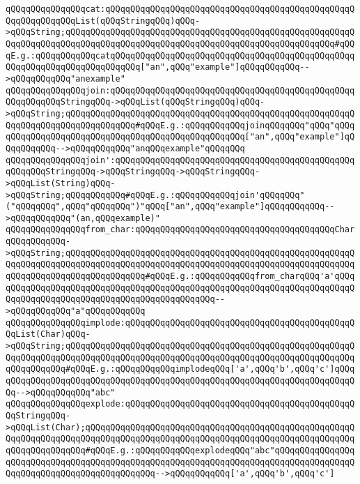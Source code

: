\verb|qQQqqQQqqQQqqQQqcat:qQQqqQQqqQQqqQQqqQQqqQQqqQQqqQQqqQQqqQQqqQQqqQQqqQQqqQQqqQQqqQQqList(qQQqStringqQQq)qQQq->qQQqString;qQQqqQQqqQQqqQQqqQQqqQQqqQQqqQQqqQQqqQQqqQQqqQQqqQQqqQQqqQQqqQQqqQQqqQQqqQQqqQQqqQQqqQQqqQQqqQQqqQQqqQQqqQQqqQQqqQQqqQQqqQQq#qQQqE.g.:qQQqqQQqqQQqcatqQQqqQQqqQQqqQQqqQQqqQQqqQQqqQQqqQQqqQQqqQQqqQQqqQQqqQQqqQQqqQQqqQQqqQQqqQQq["an",qQQq"example"]qQQqqQQqqQQq-->qQQqqQQqqQQq"anexample"|\newline
\verb|qQQqqQQqqQQqqQQqjoin:qQQqqQQqqQQqqQQqqQQqqQQqqQQqqQQqqQQqqQQqqQQqqQQqqQQqqQQqqQQqStringqQQq->qQQqList(qQQqStringqQQq)qQQq->qQQqString;qQQqqQQqqQQqqQQqqQQqqQQqqQQqqQQqqQQqqQQqqQQqqQQqqQQqqQQqqQQqqQQqqQQqqQQqqQQqqQQqqQQq#qQQqE.g.:qQQqqQQqqQQqjoinqQQqqQQq"qQQq"qQQqqQQqqQQqqQQqqQQqqQQqqQQqqQQqqQQqqQQqqQQqqQQqqQQq["an",qQQq"example"]qQQqqQQqqQQq-->qQQqqQQqqQQq"anqQQqexample"qQQqqQQq|\newline
\verb|qQQqqQQqqQQqqQQqjoin':qQQqqQQqqQQqqQQqqQQqqQQqqQQqqQQqqQQqqQQqqQQqqQQqqQQqqQQqStringqQQq->qQQqStringqQQq->qQQqStringqQQq->qQQqList(String)qQQq->qQQqString;qQQqqQQqqQQq#qQQqE.g.:qQQqqQQqqQQqjoin'qQQqqQQq"("qQQqqQQq",qQQq"qQQqqQQq")"qQQq["an",qQQq"example"]qQQqqQQqqQQq-->qQQqqQQqqQQq"(an,qQQqexample)"|\newline
\verb|qQQqqQQqqQQqqQQqfrom_char:qQQqqQQqqQQqqQQqqQQqqQQqqQQqqQQqqQQqqQQqCharqQQqqQQqqQQq->qQQqString;qQQqqQQqqQQqqQQqqQQqqQQqqQQqqQQqqQQqqQQqqQQqqQQqqQQqqQQqqQQqqQQqqQQqqQQqqQQqqQQqqQQqqQQqqQQqqQQqqQQqqQQqqQQqqQQqqQQqqQQqqQQqqQQqqQQqqQQqqQQqqQQqqQQqqQQqqQQq#qQQqE.g.:qQQqqQQqqQQqfrom_charqQQq'a'qQQqqQQqqQQqqQQqqQQqqQQqqQQqqQQqqQQqqQQqqQQqqQQqqQQqqQQqqQQqqQQqqQQqqQQqqQQqqQQqqQQqqQQqqQQqqQQqqQQqqQQqqQQqqQQqqQQq-->qQQqqQQqqQQq"a"qQQqqQQqqQQq|\newline
\verb|qQQqqQQqqQQqqQQqimplode:qQQqqQQqqQQqqQQqqQQqqQQqqQQqqQQqqQQqqQQqqQQqqQQqList(Char)qQQq->qQQqString;qQQqqQQqqQQqqQQqqQQqqQQqqQQqqQQqqQQqqQQqqQQqqQQqqQQqqQQqqQQqqQQqqQQqqQQqqQQqqQQqqQQqqQQqqQQqqQQqqQQqqQQqqQQqqQQqqQQqqQQqqQQqqQQqqQQqqQQqqQQq#qQQqE.g.:qQQqqQQqqQQqimplodeqQQq['a',qQQq'b',qQQq'c']qQQqqQQqqQQqqQQqqQQqqQQqqQQqqQQqqQQqqQQqqQQqqQQqqQQqqQQqqQQqqQQqqQQqqQQqqQQq-->qQQqqQQqqQQq"abc"|\newline
\verb|qQQqqQQqqQQqqQQqexplode:qQQqqQQqqQQqqQQqqQQqqQQqqQQqqQQqqQQqqQQqqQQqqQQqStringqQQq->qQQqList(Char);qQQqqQQqqQQqqQQqqQQqqQQqqQQqqQQqqQQqqQQqqQQqqQQqqQQqqQQqqQQqqQQqqQQqqQQqqQQqqQQqqQQqqQQqqQQqqQQqqQQqqQQqqQQqqQQqqQQqqQQqqQQqqQQqqQQqqQQqqQQq#qQQqE.g.:qQQqqQQqqQQqexplodeqQQq"abc"qQQqqQQqqQQqqQQqqQQqqQQqqQQqqQQqqQQqqQQqqQQqqQQqqQQqqQQqqQQqqQQqqQQqqQQqqQQqqQQqqQQqqQQqqQQqqQQqqQQqqQQqqQQqqQQqqQQq-->qQQqqQQqqQQq['a',qQQq'b',qQQq'c']|\newline
